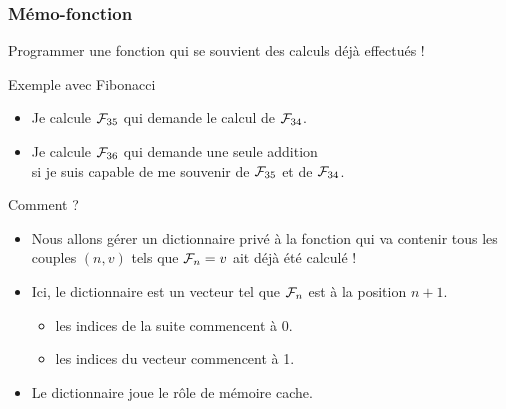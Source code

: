 \documentclass[10pt]{beamer}
\newcommand{\F}[1]{\ensuremath{{\cal F}_{#1}}\xspace}
\begin{document}
\begin{frame}
  \frametitle{Mémo-fonction}
  \alert{Programmer une fonction qui se souvient des calculs déjà effectués !}

  \begin{exampleblock}{Exemple avec Fibonacci}
    \begin{itemize}
    \item Je calcule \F{35} qui demande le calcul de \F{34}.
    \item Je calcule \F{36} qui demande une seule addition \\si je suis capable de me souvenir de \F{35} et de \F{34}.
    \end{itemize}
  \end{exampleblock}

  \begin{block}{Comment ?}
    \begin{itemize}
    \item Nous allons gérer un dictionnaire privé à la fonction qui va contenir tous les couples $(n, v)$ tels que $\F{n} = v$ ait déjà été calculé !
    \item Ici, le dictionnaire est un vecteur tel que \F{n} est à la position $n+1$.
      \begin{itemize}
      \item les indices de la suite commencent à 0.
      \item les indices du vecteur commencent à 1.
      \end{itemize}
    \item<alert@1> Le dictionnaire joue le rôle de mémoire cache.
    \end{itemize}
\end{block}



\end{frame}
\end{document}
